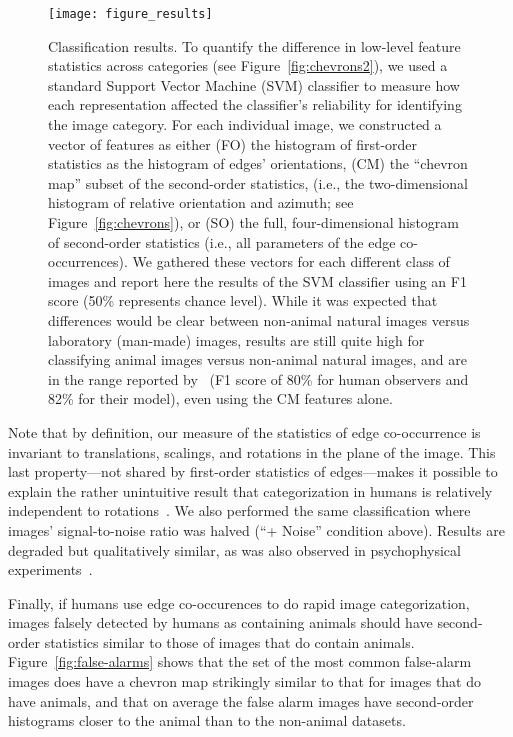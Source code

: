 \documentclass{article}%
\begin{document}
\begin{figure}%
\centering%
\texttt{[image: figure\_results]}%
\caption{%
Classification results. 
To quantify the difference in low-level feature statistics across categories (see Figure~\ref{fig:chevrons2}), we used a standard Support Vector Machine (SVM) classifier to measure how each representation affected the classifier's reliability for identifying the image category. 
For each individual image, we constructed a vector of features as either 
%
(FO) the histogram of first-order statistics as the histogram of edges'  orientations,
(CM) the ``chevron map'' subset of the second-order statistics, (i.e., the two-dimensional histogram of relative orientation and azimuth; see Figure~\ref{fig:chevrons}), or 
(SO) the full, four-dimensional histogram of second-order statistics (i.e., all parameters of the edge co-occurrences).
%
  We gathered these vectors for each different class of images and
  report here the results of the SVM classifier using an
  F1 score (50\% represents chance level).  While it was expected that differences would be clear between non-animal natural images versus
  laboratory (man-made) images, results are still quite high for
  classifying animal images versus non-animal natural images, and are in the range reported by~\citet{Serre07} (F1 score of 80\% for human observers and 82\% for their model), even 
using the CM features alone. %
\label{fig:results}}%
\end{figure}%
Note that by definition, our measure of the statistics of edge co-occurrence 
is invariant to translations, scalings, and rotations in the plane of the image.
This last property---not shared by first-order statistics of edges---makes it possible to explain the rather unintuitive result that
categorization in humans is relatively independent to rotations~\citep{Crouzet11b}. 
We also performed the same classification where images' %
signal-to-noise ratio was halved (``+ Noise'' condition above). 
Results are degraded but qualitatively similar, as was also observed
in psychophysical experiments~\citep{Wichmann06}. 

Finally, if humans use edge co-occurences to do rapid image
categorization, images falsely detected by humans as containing
animals should have second-order statistics similar to those of images
that do contain animals.  Figure~\ref{fig:false-alarms} shows that the
set of the most common false-alarm images does have a chevron map
strikingly similar to that for images that do have animals, and that
on average the false alarm images have second-order histograms closer
to the animal than to the non-animal datasets.
\end{document}
